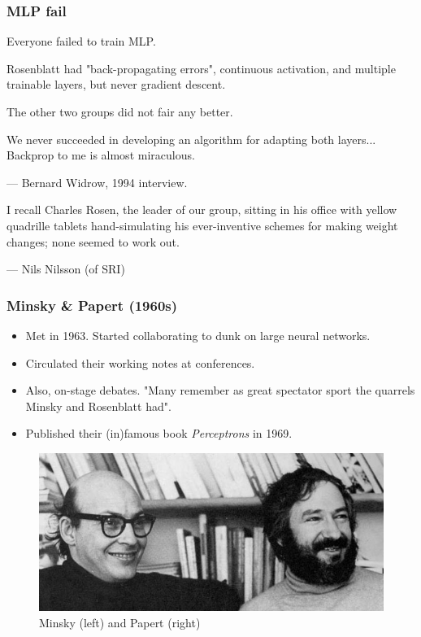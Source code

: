 \documentclass{beamer}
\begin{document}
\begin{frame}
\frametitle{MLP fail}
Everyone failed to train MLP.

Rosenblatt had "back-propagating errors", continuous activation, and multiple trainable layers, but never gradient descent.

The other two groups did not fair any better.

\begin{displayquote}
We never succeeded in developing an algorithm for adapting both layers... Backprop to me is almost miraculous.

--- Bernard Widrow, 1994 interview. \cite[page 60--61]{rosenfeldTalkingNetsOral2000}
\end{displayquote}

\begin{displayquote}
I recall Charles Rosen, the leader of our group, sitting in his office with yellow quadrille tablets hand-simulating his ever-inventive schemes for making weight changes; none seemed to work out.

--- Nils Nilsson (of SRI) \cite[section 29.4]{nilssonQuestArtificialIntelligence2009}
\end{displayquote}

\end{frame}

\begin{frame}
\frametitle{Minsky \& Papert (1960s)}
\begin{itemize}
    \item Met in 1963. Started collaborating to dunk on large neural networks.
    \item Circulated their working notes at conferences.
    \item Also, on-stage debates. "Many remember as great spectator sport the quarrels Minsky and Rosenblatt had".
    \item Published their (in)famous book \textit{Perceptrons} in 1969.
\end{itemize}
\begin{figure}[t]
    \includegraphics[width=\textwidth]{figure/Minsky_and_Papert.jpg}
    \centering
    \caption{Minsky (left) and Papert (right)}
\end{figure}

\end{frame}
    
\end{document}
